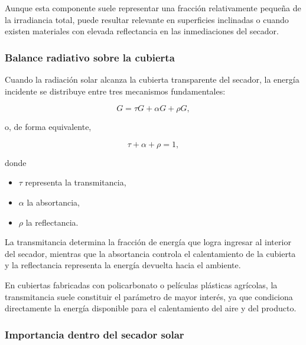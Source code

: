 Aunque esta componente suele representar una fracción relativamente pequeña de la irradiancia total, puede resultar relevante en superficies inclinadas o cuando existen materiales con elevada reflectancia en las inmediaciones del secador.

\subsubsection{Balance radiativo sobre la cubierta}

Cuando la radiación solar alcanza la cubierta transparente del secador, la energía incidente se distribuye entre tres mecanismos fundamentales:

\begin{equation}
G=\tau G+\alpha G+\rho G,
\end{equation}

o, de forma equivalente,

\begin{equation}
\tau+\alpha+\rho=1,
\label{eq:radiativebalance}
\end{equation}

donde

\begin{itemize}

\item $\tau$ representa la transmitancia,

\item $\alpha$ la absortancia,

\item $\rho$ la reflectancia.
\end{itemize}

La transmitancia determina la fracción de energía que logra ingresar al interior del secador, mientras que la absortancia controla el calentamiento de la cubierta y la reflectancia representa la energía devuelta hacia el ambiente.

En cubiertas fabricadas con policarbonato o películas plásticas agrícolas, la transmitancia suele constituir el parámetro de mayor interés, ya que condiciona directamente la energía disponible para el calentamiento del aire y del producto.

\subsubsection{Importancia dentro del secador solar}


